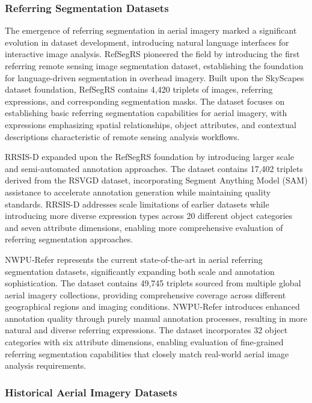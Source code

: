\subsubsection{Referring Segmentation Datasets}

The emergence of referring segmentation in aerial imagery marked a significant evolution in dataset development, introducing natural language interfaces for interactive image analysis. RefSegRS pioneered the field by introducing the first referring remote sensing image segmentation dataset, establishing the foundation for language-driven segmentation in overhead imagery. Built upon the SkyScapes dataset foundation, RefSegRS contains 4,420 triplets of images, referring expressions, and corresponding segmentation masks. The dataset focuses on establishing basic referring segmentation capabilities for aerial imagery, with expressions emphasizing spatial relationships, object attributes, and contextual descriptions characteristic of remote sensing analysis workflows.

RRSIS-D expanded upon the RefSegRS foundation by introducing larger scale and semi-automated annotation approaches. The dataset contains 17,402 triplets derived from the RSVGD dataset, incorporating Segment Anything Model (SAM) assistance to accelerate annotation generation while maintaining quality standards. RRSIS-D addresses scale limitations of earlier datasets while introducing more diverse expression types across 20 different object categories and seven attribute dimensions, enabling more comprehensive evaluation of referring segmentation approaches.

NWPU-Refer represents the current state-of-the-art in aerial referring segmentation datasets, significantly expanding both scale and annotation sophistication. The dataset contains 49,745 triplets sourced from multiple global aerial imagery collections, providing comprehensive coverage across different geographical regions and imaging conditions. NWPU-Refer introduces enhanced annotation quality through purely manual annotation processes, resulting in more natural and diverse referring expressions. The dataset incorporates 32 object categories with six attribute dimensions, enabling evaluation of fine-grained referring segmentation capabilities that closely match real-world aerial image analysis requirements.

\subsubsection{Historical Aerial Imagery Datasets}

